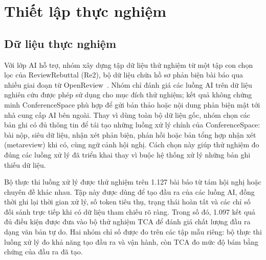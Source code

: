\section{Thiết lập thực nghiệm}

\subsection{Dữ liệu thực nghiệm}

Với lớp AI hỗ trợ, nhóm xây dựng tập dữ liệu thử nghiệm từ một tập con chọn lọc của ReviewRebuttal (Re2), bộ dữ liệu chứa hồ sơ phản biện bài báo qua nhiều giai đoạn từ OpenReview~\cite{ch4ref1}. Nhóm chỉ đánh giá các luồng AI trên dữ liệu nghiên cứu được phép sử dụng cho mục đích thử nghiệm; kết quả không chứng minh ConferenceSpace phù hợp để gửi bản thảo hoặc nội dung phản biện mật tới nhà cung cấp AI bên ngoài. Thay vì dùng toàn bộ dữ liệu gốc, nhóm chọn các bản ghi có đủ thông tin để tái tạo những luồng xử lý chính của ConferenceSpace: bài nộp, siêu dữ liệu, nhận xét phản biện, phản hồi hoặc bản tổng hợp nhận xét (metareview) khi có, cùng ngữ cảnh hội nghị. Cách chọn này giúp thử nghiệm đo đúng các luồng xử lý đã triển khai thay vì buộc hệ thống xử lý những bản ghi thiếu dữ liệu.

Bộ thực thi luồng xử lý được thử nghiệm trên 1.127 bài báo từ tám hội nghị hoặc chuyên đề khác nhau. Tập này được dùng để tạo đầu ra của các luồng AI, đồng thời ghi lại thời gian xử lý, số token tiêu thụ, trạng thái hoàn tất và các chỉ số đối sánh trực tiếp khi có dữ liệu tham chiếu rõ ràng. Trong số đó, 1.097 kết quả đủ điều kiện được đưa vào bộ thử nghiệm TCA để đánh giá chất lượng đầu ra dạng văn bản tự do. Hai nhóm chỉ số được đo trên các tập mẫu riêng: bộ thực thi luồng xử lý đo khả năng tạo đầu ra và vận hành, còn TCA đo mức độ bám bằng chứng của đầu ra đã tạo.


